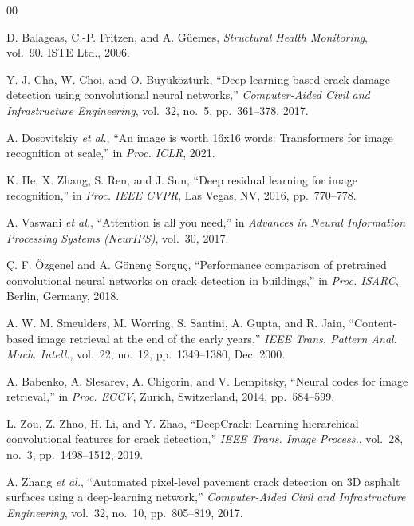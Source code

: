 \documentclass[conference]{IEEEtran}
\begin{document}
\begin{thebibliography}{00}

D. Balageas, C.-P. Fritzen, and A. G\"{u}emes, \textit{Structural Health Monitoring}, vol.~90. ISTE Ltd., 2006.

Y.-J. Cha, W. Choi, and O. B\"{u}y\"{u}k\"{o}zt\"{u}rk, ``Deep learning-based crack damage detection using convolutional neural networks,'' \textit{Computer-Aided Civil and Infrastructure Engineering}, vol.~32, no.~5, pp.~361--378, 2017.

A. Dosovitskiy \textit{et al.}, ``An image is worth 16x16 words: Transformers for image recognition at scale,'' in \textit{Proc. ICLR}, 2021.

K. He, X. Zhang, S. Ren, and J. Sun, ``Deep residual learning for image recognition,'' in \textit{Proc. IEEE CVPR}, Las Vegas, NV, 2016, pp.~770--778.

A. Vaswani \textit{et al.}, ``Attention is all you need,'' in \textit{Advances in Neural Information Processing Systems (NeurIPS)}, vol.~30, 2017.

\c{C}. F. \"{O}zgenel and A. G\"{o}nen\c{c} Sorgu\c{c}, ``Performance comparison of pretrained convolutional neural networks on crack detection in buildings,'' in \textit{Proc. ISARC}, Berlin, Germany, 2018.

A. W. M. Smeulders, M. Worring, S. Santini, A. Gupta, and R. Jain, ``Content-based image retrieval at the end of the early years,'' \textit{IEEE Trans. Pattern Anal. Mach. Intell.}, vol.~22, no.~12, pp.~1349--1380, Dec. 2000.

A. Babenko, A. Slesarev, A. Chigorin, and V. Lempitsky, ``Neural codes for image retrieval,'' in \textit{Proc. ECCV}, Zurich, Switzerland, 2014, pp.~584--599.

L. Zou, Z. Zhao, H. Li, and Y. Zhao, ``DeepCrack: Learning hierarchical convolutional features for crack detection,'' \textit{IEEE Trans. Image Process.}, vol.~28, no.~3, pp.~1498--1512, 2019.

A. Zhang \textit{et al.}, ``Automated pixel-level pavement crack detection on 3D asphalt surfaces using a deep-learning network,'' \textit{Computer-Aided Civil and Infrastructure Engineering}, vol.~32, no.~10, pp.~805--819, 2017.


\end{thebibliography}
\end{document}
